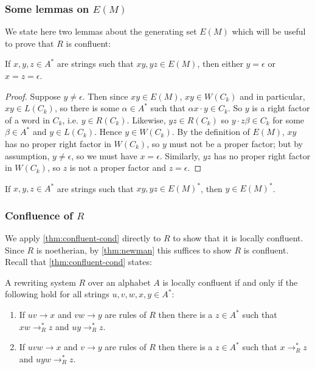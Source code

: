 \documentclass[noindex,noinsetproof,12pt]{lmaths}
\begin{document}
\subsubsection{\texorpdfstring{Some lemmas on $E(M)$}{Some lemmas on E(M)}}

We state here two lemmas about the generating set $E(M)$ which will be useful to prove that $R$ is confluent:

\begin{lemma} \label{lma:no-middle-E(M)}
	If $x, y, z \in A^*$ are strings such that $xy, yz \in E(M)$, then either $y = \epsilon$ or $x = z = \epsilon$. \incomplete
\end{lemma}
\begin{proof}
	Suppose $y \ne \epsilon$. Then since $xy \in E(M)$, $xy \in W(C_k)$ and in particular, $xy \in L(C_k)$, so there is some $\alpha \in A^*$ such that $\alpha x \cdot y \in C_k$. So $y$ is a right factor of a word in $C_k$, i.e. $y \in R(C_k)$. Likewise, $yz \in R(C_k)$ so $y \cdot z\beta \in C_k$ for some $\beta \in A^*$ and $y \in L(C_k)$. Hence $y \in W(C_k)$. By the definition of $E(M)$, $xy$ has no proper right factor in $W(C_k)$, so $y$ must not be a proper factor; but by assumption, $y \ne \epsilon$, so we must have $x = \epsilon$. Similarly, $yz$ has no proper right factor in $W(C_k)$, so $z$ is not a proper factor and $z = \epsilon$.
\end{proof}

\begin{cly} \label{cly:middle-E(M)*}
	If $x, y, z \in A^*$ are strings such that $xy, yz \in E(M)^*$, then $y \in E(M)^*$.
\end{cly}


\subsubsection{\texorpdfstring{Confluence of $R$}{Confluence of R}}

We apply \cref{thm:confluent-cond} directly to $R$ to show that it is locally confluent. Since $R$ is noetherian, by \cref{thm:newman} this suffices to show $R$ is confluent. Recall that \cref{thm:confluent-cond} states:

\begin{theorem*}
	A rewriting system $R$ over an alphabet $A$ is locally confluent if and only if the following hold for all strings $u, v, w, x, y \in A^*$:
	\begin{enumerate}[(1)]
		\item If $uv \to x$ and $vw \to y$ are rules of $R$ then there is a $z \in A^*$ such that $xw \to^*_R z$ and $uy \to^*_R z$.
		\item If $uvw \to x$ and $v \to y$ are rules of $R$ then there is a $z \in A^*$ such that $x \to^*_R z$ and $uyw \to^*_R z$.
	\end{enumerate}
\end{theorem*}
\end{document}
